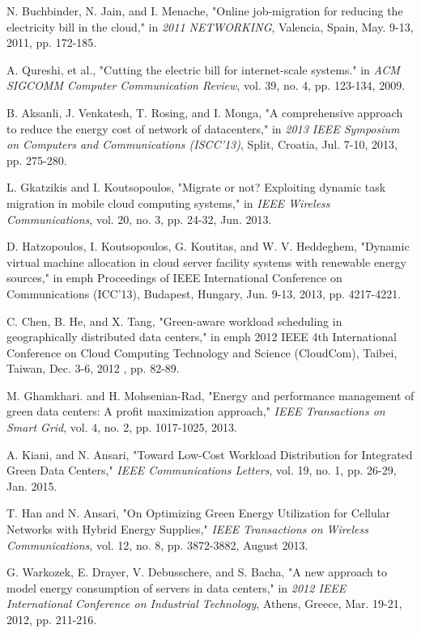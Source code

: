 \documentclass[journal,12pt,draftclsnofoot,onecolumn]{IEEEtran}
\begin{document}
\begin{thebibliography}{15}
N. Buchbinder, N. Jain, and I. Menache, "Online job-migration for reducing the electricity bill in the cloud," in \emph{2011 NETWORKING}, Valencia, Spain, May. 9-13, 2011, pp. 172-185. 

A. Qureshi, et al., "Cutting the electric bill for internet-scale systems." in \emph{ACM SIGCOMM Computer Communication Review}, vol. 39, no. 4, pp. 123-134, 2009.

B. Aksanli, J. Venkatesh, T. Rosing, and I. Monga, "A comprehensive approach to reduce the energy cost of network of datacenters," in \emph{2013 IEEE Symposium on Computers and Communications (ISCC'13)}, Split, Croatia, Jul. 7-10, 2013, pp. 275-280.

L. Gkatzikis and I. Koutsopoulos, "Migrate or not? Exploiting dynamic task migration in mobile cloud computing systems," in \emph{IEEE Wireless Communications}, vol. 20, no. 3, pp. 24-32, Jun. 2013.

D. Hatzopoulos, I. Koutsopoulos, G. Koutitas, and W. V. Heddeghem, "Dynamic virtual machine allocation in cloud server facility systems with renewable energy sources," in emph{ Proceedings of IEEE International Conference on Communications (ICC'13)}, Budapest, Hungary, Jun. 9-13, 2013, pp. 4217-4221.

C. Chen, B. He, and X. Tang, "Green-aware workload scheduling in geographically distributed data centers," in emph{ 2012 IEEE 4th International Conference on Cloud Computing Technology and Science (CloudCom)}, Taibei, Taiwan, Dec. 3-6, 2012 , pp. 82-89.

M. Ghamkhari. and H. Mohsenian-Rad, "Energy and performance management of green data centers: A profit maximization approach," \emph{IEEE Transactions on Smart Grid}, vol. 4, no. 2, pp. 1017-1025, 2013. 

A. Kiani, and N. Ansari, "Toward Low-Cost Workload Distribution for Integrated Green Data Centers," \emph{IEEE Communications Letters}, vol. 19, no. 1, pp. 26-29, Jan. 2015.

T. Han and N. Ansari, "On Optimizing Green Energy Utilization for Cellular Networks with Hybrid Energy Supplies," \emph{IEEE Transactions on Wireless Communications}, vol. 12, no. 8, pp. 3872-3882, August 2013.

G. Warkozek, E. Drayer, V. Debusschere, and S. Bacha, "A new approach to model energy consumption of servers in data centers," in \emph{2012 IEEE International Conference on Industrial Technology}, Athens, Greece, Mar. 19-21, 2012, pp. 211-216.


\end{thebibliography}
\end{document}

